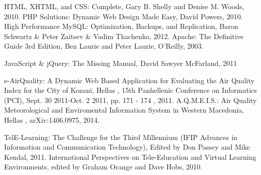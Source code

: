 \documentclass[10pt, conference, compsocconf]{IEEEtran}
\begin{document}
\begin{thebibliography}{1}




 HTML, XHTML, and CSS: Complete, Gary B. Shelly and Denise M. Woods, 2010.
PHP Solutions: Dynamic Web Design Made Easy, David Powers, 2010.
  High Performance MySQL: Optimization, Backups, and Replication, Baron Schwartz \& Peter Zaitsev \& Vadim Tkachenko, 2012.
 Apache: The Definitive Guide 3rd Edition, Ben Laurie and Peter Laurie, O’Reilly, 2003. 
 
 JavaScript \& jQuery: The Missing Manual, David Sawyer McFarland, 2011
 
 e-AirQuality: A Dynamic Web Based Application for Evaluating the Air Quality Index for the City of Kozani, Hellas , 15th Panhellenic Conference on Informatics (PCI), Sept. 30 2011-Oct. 2 2011, pp. 171 - 174 , 2011.
A.Q.M.E.I.S.: Air Quality Meteorological and Enviromental Information System in Western Macedonia, Hellas , arXiv:1406.0975, 2014.

 TelE-Learning: The Challenge for the Third Millennium (IFIP Advances in Information and Communication Technology), Edited by Don Passey and Mike Kendal, 2011.
 International Perspectives on Tele-Education and Virtual Learning Environments,  edited by Graham Orange and Dave Hobs, 2010.





\end{thebibliography}
\end{document}
